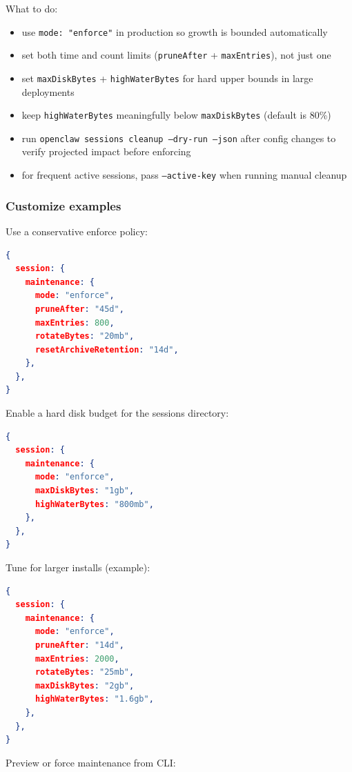 What to do:

\begin{itemize}
  \item use \texttt{mode: "enforce"} in production so growth is bounded automatically
  \item set both time and count limits (\texttt{pruneAfter} + \texttt{maxEntries}), not just one
  \item set \texttt{maxDiskBytes} + \texttt{highWaterBytes} for hard upper bounds in large deployments
  \item keep \texttt{highWaterBytes} meaningfully below \texttt{maxDiskBytes} (default is 80\%)
  \item run \texttt{openclaw sessions cleanup --dry-run --json} after config changes to verify projected impact before enforcing
  \item for frequent active sessions, pass \texttt{--active-key} when running manual cleanup
\end{itemize}


\subsubsection{Customize examples}


Use a conservative enforce policy:

\begin{lstlisting}[language=json]
{
  session: {
    maintenance: {
      mode: "enforce",
      pruneAfter: "45d",
      maxEntries: 800,
      rotateBytes: "20mb",
      resetArchiveRetention: "14d",
    },
  },
}
\end{lstlisting}


Enable a hard disk budget for the sessions directory:

\begin{lstlisting}[language=json]
{
  session: {
    maintenance: {
      mode: "enforce",
      maxDiskBytes: "1gb",
      highWaterBytes: "800mb",
    },
  },
}
\end{lstlisting}


Tune for larger installs (example):

\begin{lstlisting}[language=json]
{
  session: {
    maintenance: {
      mode: "enforce",
      pruneAfter: "14d",
      maxEntries: 2000,
      rotateBytes: "25mb",
      maxDiskBytes: "2gb",
      highWaterBytes: "1.6gb",
    },
  },
}
\end{lstlisting}


Preview or force maintenance from CLI:

